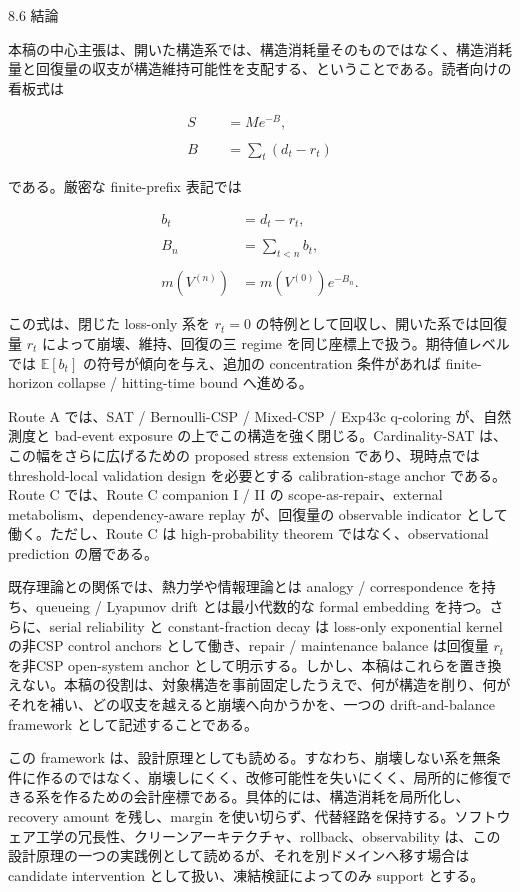 \documentclass[12pt,a4paper]{article}
\begin{document}
8.6 結論

本稿の中心主張は、開いた構造系では、構造消耗量そのものではなく、構造消耗量と回復量の収支が構造維持可能性を支配する、ということである。読者向けの看板式は

\[
\begin{aligned}
S &= M e^{-B}, \\
\qquad \\
B&=\sum_{t}(d_{t}-r_{t})
\end{aligned}
\]

である。厳密な finite-prefix 表記では

\[
\begin{aligned}
b_{t}&=d_{t}-r_{t}, \\
\qquad \\
B_{n}&=\sum_{t<n}b_{t}, \\
\qquad \\
m(V^{(n)})&=m(V^{(0)})e^{-B_{n}}.
\end{aligned}
\]

この式は、閉じた loss-only 系を \(r_{t}=0\) の特例として回収し、開いた系では回復量 \(r_{t}\) によって崩壊、維持、回復の三 regime を同じ座標上で扱う。期待値レベルでは \(\mathbb E[b_{t}]\) の符号が傾向を与え、追加の concentration 条件があれば finite-horizon collapse / hitting-time bound へ進める。

Route A では、SAT / Bernoulli-CSP / Mixed-CSP / Exp43c q-coloring が、自然測度と bad-event exposure の上でこの構造を強く閉じる。Cardinality-SAT は、この幅をさらに広げるための proposed stress extension であり、現時点では threshold-local validation design を必要とする calibration-stage anchor である。Route C では、Route C companion I / II の scope-as-repair、external metabolism、dependency-aware replay が、回復量の observable indicator として働く。ただし、Route C は high-probability theorem ではなく、observational prediction の層である。

既存理論との関係では、熱力学や情報理論とは analogy / correspondence を持ち、queueing / Lyapunov drift とは最小代数的な formal embedding を持つ。さらに、serial reliability と constant-fraction decay は loss-only exponential kernel の非CSP control anchors として働き、repair / maintenance balance は回復量 \(r_{t}\) を非CSP open-system anchor として明示する。しかし、本稿はこれらを置き換えない。本稿の役割は、対象構造を事前固定したうえで、何が構造を削り、何がそれを補い、どの収支を越えると崩壊へ向かうかを、一つの drift-and-balance framework として記述することである。

この framework は、設計原理としても読める。すなわち、崩壊しない系を無条件に作るのではなく、崩壊しにくく、改修可能性を失いにくく、局所的に修復できる系を作るための会計座標である。具体的には、構造消耗を局所化し、recovery amount を残し、margin を使い切らず、代替経路を保持する。ソフトウェア工学の冗長性、クリーンアーキテクチャ、rollback、observability は、この設計原理の一つの実践例として読めるが、それを別ドメインへ移す場合は candidate intervention として扱い、凍結検証によってのみ support とする。
\end{document}
